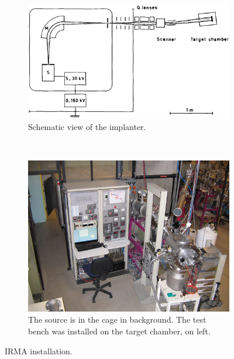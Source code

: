 \begin{figure}[!ht]
	\begin{subfigure}{0.5\textwidth}
		\includegraphics[width=\textwidth]{04_IPHI_Test/figures/fig000_IRMA01.png}
		\caption{Schematic view of the implanter.}
		\label{}
	\end{subfigure}
	~
	\begin{subfigure}{0.5\textwidth}
		\includegraphics[width=\textwidth]{04_IPHI_Test/figures/fig000_IRMA02.jpg}
		\caption{The source is in the cage in background. The test bench was installed on the target chamber, on left.}
		\label{}
	\end{subfigure}
	\caption[IRMA installation]{IRMA installation.}
	\label{chap4:IRMA}
\end{figure}
